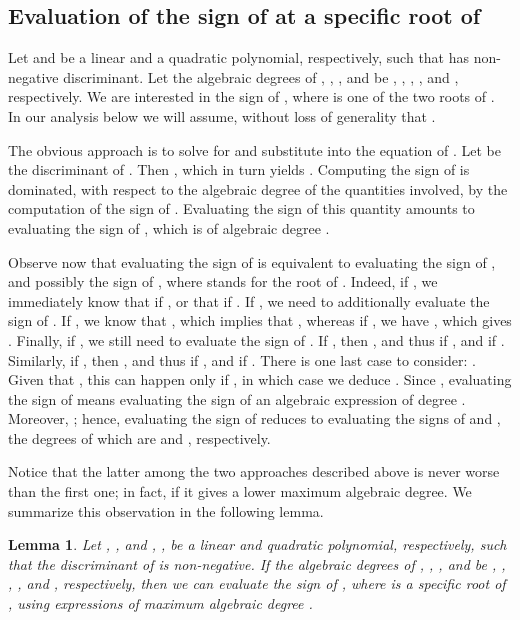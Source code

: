 \documentclass[letterpaper,11pt]{article}
\newtheorem{lemma}[theorem]{Lemma}
\begin{document}
{\subsection{Evaluation of the sign of  at a specific
  root of }\label{sec:lqsolve}

Let  and  be a linear and a
quadratic polynomial, respectively, such that  has non-negative
discriminant. Let the algebraic degrees of , , , 
and  be , , , , and
, respectively. We are interested in the sign of
, where  is one of the two roots 
of . In our analysis below we will assume, without loss of
generality that .

The obvious approach is to solve for  and substitute into the
equation of . Let  be the discriminant of 
. Then , which in turn
yields . Computing
the sign of  is dominated, with respect to the algebraic
degree of the quantities involved, by the computation of the 
sign of . Evaluating the sign
of this quantity amounts to evaluating the sign of
, which is of algebraic degree
.

Observe now that evaluating the sign of  is equivalent to
evaluating the sign of , and possibly the sign of
, where  stands for the root of
.
Indeed, if , we immediately know that 
if , or that  if . If
, we need to additionally evaluate the sign of
. If , we know that
, which implies that , whereas if
, we have , which gives
. Finally, if , we still need to evaluate the
sign of . If , then ,
and thus  if , and  if
. Similarly, if , then ,
and thus  if , and  if
. There is one last case to consider:
. Given that , this can happen only if
, in which case we deduce .
Since , evaluating
the sign of  means evaluating the sign of an algebraic
expression of degree . Moreover,
; hence, evaluating the sign of
 reduces to evaluating the signs of  and
, the degrees of which are  and ,
respectively. 

Notice that the latter among the two approaches described above is never
worse than the first one; in fact, if  it gives a lower
maximum algebraic degree. We summarize this observation in the
following lemma.

\begin{lemma}\label{lemma:lqsolve}
  Let , , and ,
  , be a linear and quadratic polynomial, respectively,
  such that the discriminant of  is non-negative. If the
  algebraic degrees of , , ,  and  be
  , , , , and
  , respectively, then we can evaluate the sign of
  , where  is a specific root of , using
  expressions of maximum algebraic degree .
\end{lemma}

}
\end{document}

